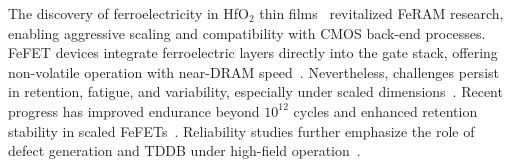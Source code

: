 The discovery of ferroelectricity in HfO$_2$ thin films~\cite{boscke2011} revitalized FeRAM research, enabling aggressive scaling and compatibility with CMOS back-end processes. 
FeFET devices integrate ferroelectric layers directly into the gate stack, offering non-volatile operation with near-DRAM speed~\cite{mueller2012}. 
Nevertheless, challenges persist in retention, fatigue, and variability, especially under scaled dimensions~\cite{schenk2015, kim2020_fefet}. 
Recent progress has improved endurance beyond $10^{12}$ cycles and enhanced retention stability in scaled FeFETs~\cite{li2022}. 
Reliability studies further emphasize the role of defect generation and TDDB under high-field operation~\cite{park2019_tddb}.
